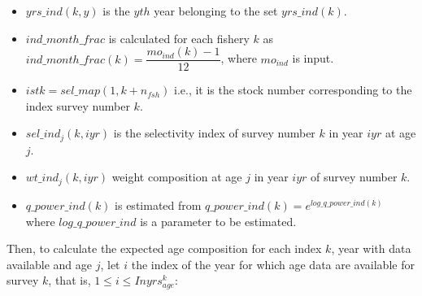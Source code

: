 \documentclass{article}
\begin{document}
\begin{itemize}

    \item $yrs\_ind(k,y)$ is the $yth$ year belonging to the set $yrs\_ind(k)$.

    
    \item $ind\_month\_frac$ is calculated for each fishery $k$ as $ind\_month\_frac(k)=\dfrac{mo_{ind}(k)-1}{12}$, where $mo_{ind}$ is input.
    
    \item $istk=sel\_map(1,k+n_{fsh})$ 
    i.e., it is the stock number corresponding to the index survey number $k$.
    
    \item $sel\_ind_j(k,iyr)$ 
    is the selectivity index of survey number $k$ in year $iyr$ at age $j$.
    
    \item $wt\_ind_j(k,iyr)$ 
    weight composition at age $j$ in year $iyr$ of survey number $k$. %
    
    \item $q\_power\_ind(k)$ is estimated from $q\_power\_ind(k) = e^{log\_q\_power\_ind(k) }$ where $log\_q\_power\_ind$ is a parameter to be estimated.
    
\end{itemize} 

Then, to calculate the expected age composition for each index $k$, year with data available  and age $j$, %
let $i$ the index of the year for which age data are available for survey $k$, that is, $1\leq i \leq Inyrs^k_{age}$:
\end{document}
